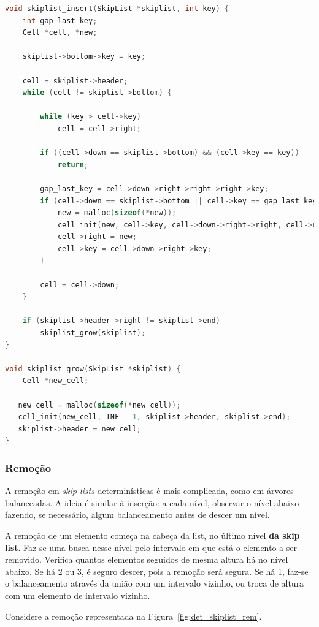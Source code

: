 \documentclass[paper=a4, fontsize=11pt]{scrartcl} %
\numberwithin{equation}{section}
\numberwithin{figure}{section}
\numberwithin{table}{section}
\numberwithin{definition}{section}
\numberwithin{theorem}{section}
\numberwithin{property}{section}
\numberwithin{proposition}{section}
\newcommand{\sls}{\textit{skip lists}\xspace}
\begin{document}
\begin{lstlisting}[caption=Algoritmo de inserção em TB 1-2-3 skip list, language=C]
void skiplist_insert(SkipList *skiplist, int key) {
    int gap_last_key;
    Cell *cell, *new;

    skiplist->bottom->key = key;

    cell = skiplist->header;
    while (cell != skiplist->bottom) {

        while (key > cell->key)
            cell = cell->right;

        if ((cell->down == skiplist->bottom) && (cell->key == key))
            return;

        gap_last_key = cell->down->right->right->right->key;
        if (cell->down == skiplist->bottom || cell->key == gap_last_key) {
            new = malloc(sizeof(*new));
            cell_init(new, cell->key, cell->down->right->right, cell->right);
            cell->right = new;
            cell->key = cell->down->right->key;
        }

        cell = cell->down;
    }

    if (skiplist->header->right != skiplist->end)
        skiplist_grow(skiplist);
}

void skiplist_grow(SkipList *skiplist) {
    Cell *new_cell;

   new_cell = malloc(sizeof(*new_cell));
   cell_init(new_cell, INF - 1, skiplist->header, skiplist->end);
   skiplist->header = new_cell;
}
\end{lstlisting}


\subsubsection{Remoção}

A remoção em \sls determinísticas é mais complicada, como em árvores balanceadas. 
A ideia é similar à inserção: a cada nível, observar o nível abaixo fazendo, se necessário, algum 
balanceamento antes de descer um nível.

A remoção de um elemento começa na cabeça da list, no último nível \textbf{da skip list}. Faz-se uma busca nesse nível 
pelo intervalo em que está o elemento a ser removido. Verifica quantos elementos seguidos de mesma altura
há no nível abaixo. Se há 2 ou 3, é seguro descer, pois a remoção será segura. Se há 1, faz-se o 
balanceamento através da união com um intervalo vizinho, ou troca de altura com um elemento de
intervalo vizinho.


Considere a remoção representada na Figura~\ref{fig:det_skiplist_rem}.
\end{document}
